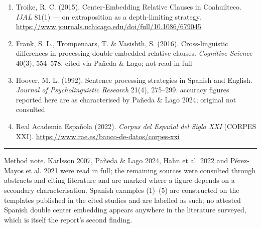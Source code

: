 \documentclass[11pt, a4paper]{article}
\begin{document}
\begin{enumerate}[leftmargin=1.6em, itemsep=0.6em, label={}]
\item Troike, R. C. (2015). Center-Embedding Relative Clauses in Coahuilteco. \emph{IJAL} 81(1) --- on extraposition as a depth-limiting strategy. \url{https://www.journals.uchicago.edu/doi/full/10.1086/679045}
\item Frank, S. L., Trompenaars, T. \& Vasishth, S. (2016). Cross-linguistic differences in processing double-embedded relative clauses. \emph{Cognitive Science} 40(3), 554--578. {\footnotesize\ttfamily\color{midgray}cited via Pañeda \& Lago; not read in full}
\item Hoover, M. L. (1992). Sentence processing strategies in Spanish and English. \emph{Journal of Psycholinguistic Research} 21(4), 275--299. {\footnotesize\ttfamily\color{midgray}accuracy figures reported here are as characterised by Pañeda \& Lago 2024; original not consulted}
\item Real Academia Española (2022). \emph{Corpus del Español del Siglo XXI} (CORPES XXI). \url{https://www.rae.es/banco-de-datos/corpes-xxi}
\end{enumerate}

\vspace{1em}
\noindent\rule{\linewidth}{0.4pt}\par
\vspace{0.6em}
\begingroup\RaggedRight\footnotesize\ttfamily\color{midgray}
Method note. Karlsson 2007, Pañeda \& Lago 2024, Hahn et al. 2022 and Pérez-Mayos et al. 2021 were read in full; the remaining sources were consulted through abstracts and citing literature and are marked where a figure depends on a secondary characterisation. Spanish examples (1)--(5) are constructed on the templates published in the cited studies and are labelled as such; no attested Spanish double center embedding appears anywhere in the literature surveyed, which is itself the report's second finding.
\par\endgroup
\end{document}

